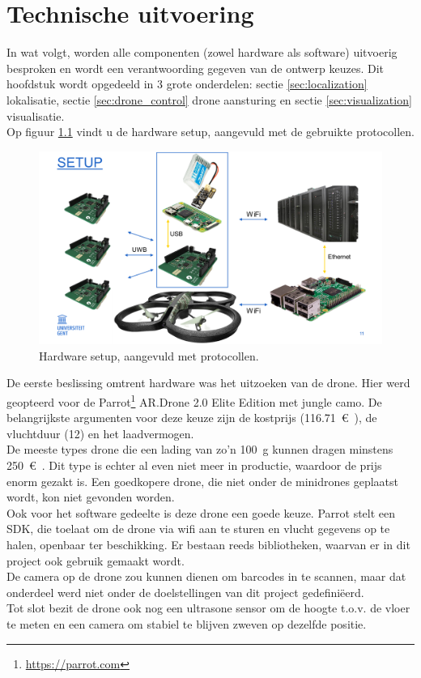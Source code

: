 \chapter{Technische uitvoering}
In wat volgt, worden alle componenten (zowel hardware als software) uitvoerig besproken en wordt een verantwoording gegeven van de ontwerp keuzes.
Dit hoofdstuk wordt opgedeeld in 3 grote onderdelen: sectie \ref{sec:localization} lokalisatie, sectie \ref{sec:drone_control} drone aansturing en sectie \ref{sec:visualization} visualisatie.\\

Op figuur \ref{fig:setup} vindt u de hardware setup, aangevuld met de gebruikte protocollen.\\
\begin{figure}[p]
	\centering
	\includegraphics[width=\textwidth]{Setup}
	\caption[Setup]{Hardware setup, aangevuld met protocollen.}
	\label{fig:setup}
\end{figure}

De eerste beslissing omtrent hardware was het uitzoeken van de drone.
Hier werd geopteerd voor de Parrot\footnote{\url{https://parrot.com}} AR.Drone 2.0 Elite Edition met jungle camo.
De belangrijkste argumenten voor deze keuze zijn de kostprijs (\SI{116.71}{\euro{}}), de vluchtduur (\SI{12}{\min}) en het laadvermogen.\\
De meeste types drone die een lading van zo'n \SI{100}{\g} kunnen dragen minstens \SI{250}{\euro{}}.
Dit type is echter al even niet meer in productie, waardoor de prijs enorm gezakt is.
Een goedkopere drone, die niet onder de minidrones geplaatst wordt, kon niet gevonden worden.\\
Ook voor het software gedeelte is deze drone een goede keuze. Parrot stelt een SDK, die toelaat om de drone via wifi aan te sturen en vlucht gegevens op te halen, openbaar ter beschikking.
Er bestaan reeds bibliotheken, waarvan er in dit project ook gebruik gemaakt wordt.\\
De camera op de drone zou kunnen dienen om barcodes in te scannen, maar dat onderdeel werd niet onder de doelstellingen van dit project gedefiniëerd.\\
Tot slot bezit de drone ook nog een ultrasone sensor om de hoogte t.o.v. de vloer te meten en een camera om stabiel te blijven zweven op dezelfde positie.\\

